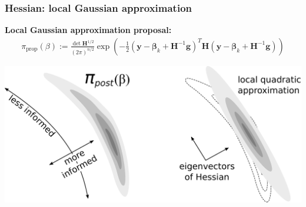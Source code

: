 \documentclass[10pt,final,xcolor=dvipsnames]{beamer}
\newcommand{\bs}[1]{\ensuremath{\boldsymbol{#1}}}
\begin{document}
\begin{frame}
  \frametitle{Hessian: local Gaussian approximation}
  
  \newcommand{\proposal}{\bs y}
  \newcommand{\params}{\bs m}
  
  \textbf{Local Gaussian approximation proposal:}
  \begin{align*}
  \pi_\text{prop}(\beta) := \frac { \det \bs H^{1/2} }{(2\pi)^{n/2} }
  \exp \left( - \frac 12 \left( \proposal - \bs{\beta}_k + \bs H^{-1} \bs
  g \right) ^T \bs H \left( \proposal - \bs{\beta}_k + \bs H^{-1} \bs g \right)
  \right)
  \end{align*}
  
  \vspace{0.25cm}

  \begin{center}
  \includegraphics[scale=0.25]{informed_uninformed_modes_combined.pdf}
  \end{center}
\end{frame}
\end{document}
